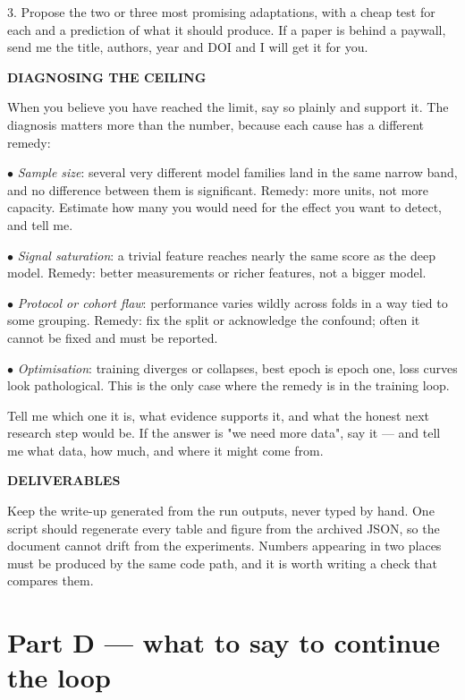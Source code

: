 \documentclass[11pt,a4paper]{article}
\begin{document}
\begin{promptbox}
3. Propose the two or three most promising adaptations, with a cheap test for
each and a prediction of what it should produce. If a paper is behind a
paywall, send me the title, authors, year and DOI and I will get it for you.

\vspace{3pt}\textbf{DIAGNOSING THE CEILING}

When you believe you have reached the limit, say so plainly and support it. The
diagnosis matters more than the number, because each cause has a different
remedy:

$\bullet$ \emph{Sample size}: several very different model families land in the
same narrow band, and no difference between them is significant. Remedy: more
units, not more capacity. Estimate how many you would need for the effect you
want to detect, and tell me.

$\bullet$ \emph{Signal saturation}: a trivial feature reaches nearly the same
score as the deep model. Remedy: better measurements or richer features, not a
bigger model.

$\bullet$ \emph{Protocol or cohort flaw}: performance varies wildly across folds
in a way tied to some grouping. Remedy: fix the split or acknowledge the
confound; often it cannot be fixed and must be reported.

$\bullet$ \emph{Optimisation}: training diverges or collapses, best epoch is
epoch one, loss curves look pathological. This is the only case where the
remedy is in the training loop.

Tell me which one it is, what evidence supports it, and what the honest next
research step would be. If the answer is "we need more data", say it --- and
tell me what data, how much, and where it might come from.

\vspace{3pt}\textbf{DELIVERABLES}

Keep the write-up generated from the run outputs, never typed by hand. One
script should regenerate every table and figure from the archived JSON, so the
document cannot drift from the experiments. Numbers appearing in two places must
be produced by the same code path, and it is worth writing a check that compares
them.
\end{promptbox}

\section{Part D --- what to say to continue the loop}
\end{document}
